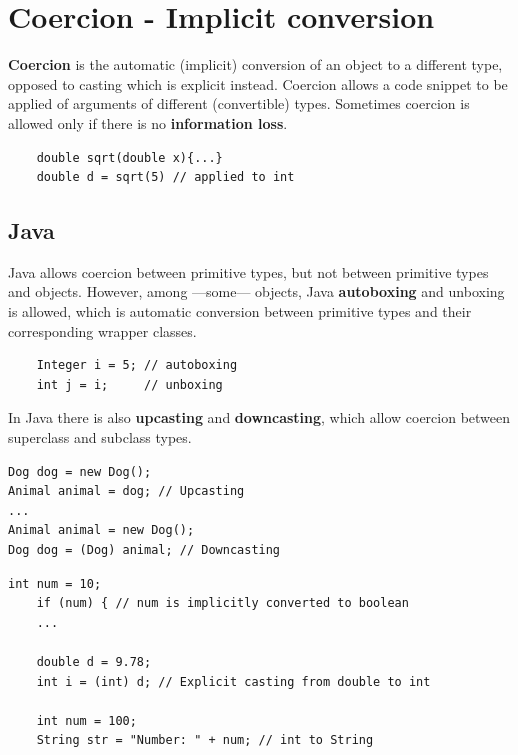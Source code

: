 \lstset{style=javaBlockAnn}
\section{Coercion - Implicit conversion}
\textbf{Coercion} is the automatic (implicit) conversion of an object to a different type, opposed to casting which is explicit instead.
Coercion allows a code snippet to be applied of arguments of different (convertible) types.
Sometimes coercion is allowed only if there is no \textbf{information loss}.

\begin{lstlisting}
    double sqrt(double x){...}
    double d = sqrt(5) // applied to int
\end{lstlisting}

\subsection{Java}
Java allows coercion between primitive types, but not between primitive types and objects.
However, among ---some--- objects, Java \textbf{autoboxing} and unboxing is allowed, which is automatic conversion between primitive types and their corresponding wrapper classes.
\begin{lstlisting}
    Integer i = 5; // autoboxing
    int j = i;     // unboxing
\end{lstlisting}

In Java there is also \textbf{upcasting} and \textbf{downcasting}, which allow coercion between superclass and subclass types.
\begin{lstlisting}
Dog dog = new Dog();
Animal animal = dog; // Upcasting
...
Animal animal = new Dog();
Dog dog = (Dog) animal; // Downcasting
\end{lstlisting}

\begin{lstlisting}[caption={Other examples of coercion in Java},captionpos=t]
    int num = 10;
    if (num) { // num is implicitly converted to boolean
    ...

    double d = 9.78;
    int i = (int) d; // Explicit casting from double to int

    int num = 100;
    String str = "Number: " + num; // int to String
\end{lstlisting}

